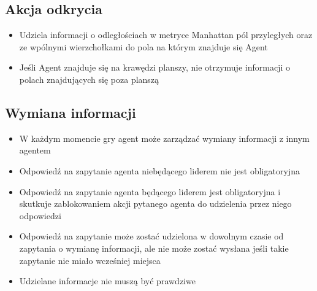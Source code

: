 \documentclass[Dokumentacja.tex]{subfiles}
\begin{document}
\subsection{Akcja odkrycia}
\begin{itemize}
    \item Udziela informacji o odległościach w metryce Manhattan pól przyległych oraz ze wpólnymi wierzchołkami do pola na którym znajduje się Agent
    \item Jeśli Agent znajduje się na krawędzi planszy, nie otrzymuje informacji o polach znajdujących się poza planszą
\end{itemize}
\subsection{Wymiana informacji}
\begin{itemize}
    \item W każdym momencie gry agent może zarządzać wymiany informacji z innym agentem
    \item Odpowiedź na zapytanie agenta niebędącego liderem nie jest obligatoryjna
    \item Odpowiedź na zapytanie agenta będącego liderem jest obligatoryjna i skutkuje zablokowaniem akcji pytanego agenta do udzielenia przez niego odpowiedzi
    \item Odpowiedź na zapytanie może zostać udzielona w dowolnym czasie od zapytania o wymianę informacji, ale nie może zostać wysłana jeśli takie zapytanie nie miało wcześniej miejsca
    \item Udzielane informacje nie muszą być prawdziwe
\end{itemize}
\end{document}
